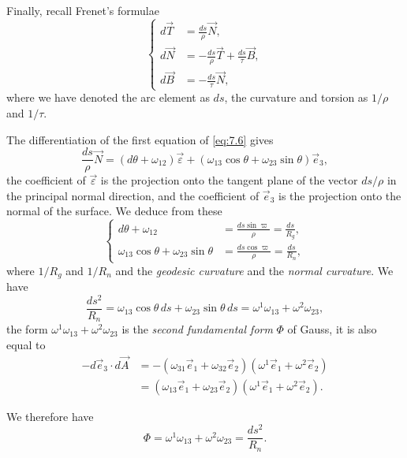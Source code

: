 \documentclass[leqno,11pt]{book}
\numberwithin{equation}{chapter}
\theoremstyle{shape1}
\theoremstyle{shape0}
\theoremstyle{shape2}
\theoremstyle{definition}
\begin{document}
Finally, recall Frenet's formulae
\begin{equation}
  \label{eq:7.7}
  \left\{
    \begin{aligned}
      d\vec T&=\frac{ds}{\rho}\vec N,\\
      d\vec N&=-\frac{ds}{\rho}\vec T+\frac{ds}{\tau}\vec B,\\
      d\vec B&=-\frac{ds}{\tau}\vec N,
    \end{aligned}
  \right.
\end{equation}
where we have denoted the arc element as $ds$, the curvature and torsion as $1/\rho$ and $1/\tau$.

The differentiation of the first equation of \eqref{eq:7.6} gives
\[
\frac{ds}{\rho}\vec N=(d\theta+\omega_{12})\vec\varepsilon+(\omega_{13}\cos\theta+\omega_{23}\sin\theta)\vec e_{3},
\]
the coefficient of $\vec \varepsilon$ is the projection onto the tangent plane of the vector $ds/\rho$ in the principal normal direction, and the coefficient of $\vec e_{3}$ is the projection onto the normal of the surface. We deduce from these
\begin{equation}
  \label{eq:7.8}
  \left\{
    \begin{aligned}
      d\theta+\omega_{12}&=\frac{ds\sin\varpi}{\rho}=\frac{ds}{R_{g}},\\
      \omega_{13}\cos\theta+\omega_{23}\sin\theta&=\frac{ds\cos\varpi}{\rho}=\frac{ds}{R_{n}},
    \end{aligned}
  \right.
\end{equation}
where $1/R_{g}$ and $1/R_{n}$ and the \emph{geodesic curvature} and the \emph{normal curvature}. We have
\[
\frac{ds^{2}}{R_{n}}=\omega_{13}\cos\theta\,ds+\omega_{23}\sin\theta\,ds=\omega^{1}\omega_{13}+\omega^{2}\omega_{23},
\]
the form $\omega^{1}\omega_{13}+\omega^{2}\omega_{23}$ is the \emph{second fundamental form} $\Phi$ of Gauss, it is also equal to
\begin{align*}
-d\vec e_{3}\cdot d\vec A&=-(\omega_{31}\vec e_{1}+\omega_{32}\vec e_{2})(\omega^{1}\vec e_{1}+\omega^{2}\vec e_{2})\\
&=(\omega_{13}\vec e_{1}+\omega_{23}\vec e_{2})(\omega^{1}\vec e_{1}+\omega^{2}\vec e_{2}).
\end{align*}

We therefore have
\begin{equation}
  \label{eq:7.9}
  \Phi=\omega^{1}\omega_{13}+\omega^{2}\omega_{23}=\frac{ds^{2}}{R_{n}}.
\end{equation}
\end{document}
